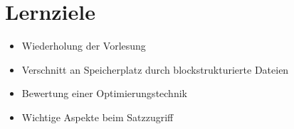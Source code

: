 \section*{Lernziele}
\begin{itemize}
	\item Wiederholung der Vorlesung
	\item Verschnitt an Speicherplatz durch blockstrukturierte Dateien
	\item Bewertung einer Optimierungstechnik
	\item Wichtige Aspekte beim Satzzugriff
\end{itemize}
